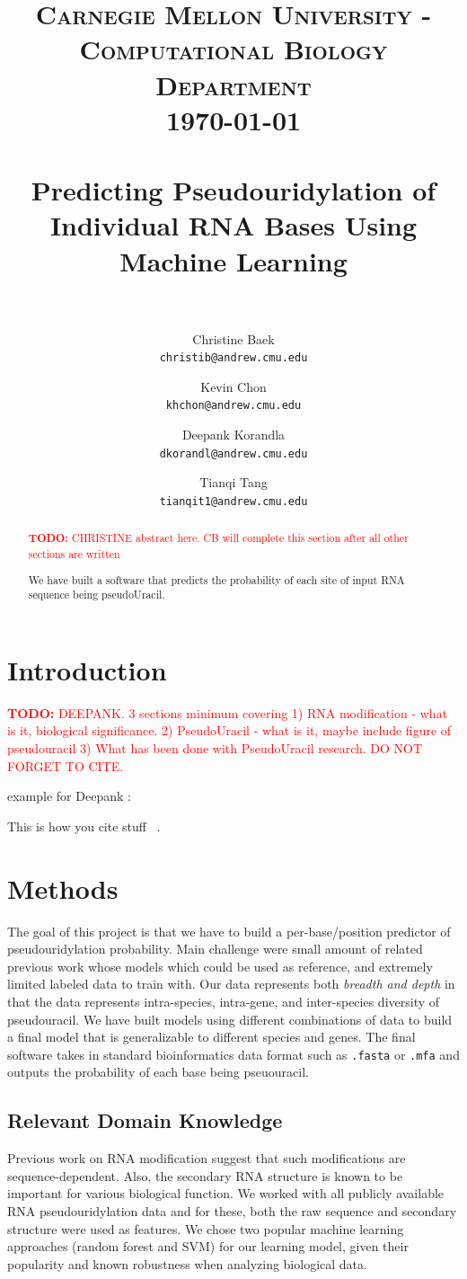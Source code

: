 \documentclass[paper=a4, fontsize=11pt]{scrartcl}
\title{
    \usefont{OT1}{bch}{b}{n}
    \normalfont \normalsize \textsc{Carnegie Mellon University - Computational Biology Department} \\ [25pt]
    \today \\
    \horrule{0.5pt} \\[0.4cm]
    \huge Predicting Pseudouridylation of Individual RNA Bases Using Machine Learning\\
    \horrule{2pt} \\[0.5cm]
}
\author{
  Christine Baek\\
  \normalsize\texttt{christib@andrew.cmu.edu}
  \and
  Kevin Chon\\
  \normalsize\texttt{khchon@andrew.cmu.edu}
  \and
  Deepank Korandla\\
  \normalsize\texttt{dkorandl@andrew.cmu.edu}
   \and
  Tianqi Tang\\
  \normalsize\texttt{tianqit1@andrew.cmu.edu}
  \date{}
}
\date{}
\numberwithin{equation}{section}    %
\numberwithin{figure}{section}      %
\numberwithin{table}{section}       %
\newcommand{\TODO}[1]{\textcolor{red}{\textbf{TODO: } #1}}
\numberwithin{equation}{section}    %
\numberwithin{figure}{section}      %
\numberwithin{table}{section}       %
\begin{document}
\maketitle

\begin{abstract}
\TODO{CHRISTINE abstract here. CB will complete this section after all other sections are written}

We have built a software that predicts the probability of each site of input RNA sequence being pseudoUracil. 
\end{abstract}


\section{Introduction}

\TODO{DEEPANK. 3 sections minimum covering 1) RNA modification - what is it, biological significance. 2) PseudoUracil - what is it, maybe include figure of pseudouracil 3) What has been done with PseudoUracil research. DO NOT FORGET TO CITE.}

example for Deepank : 

This is how you cite stuff ~\cite{schwartz}.




\section{Methods}


The goal of this project is that we have to build a per-base/position predictor of pseudouridylation probability. Main challenge were small amount of related previous work whose models which could be used as reference, and extremely limited labeled data to train with. Our data represents both \textit{breadth and depth} in that the data represents intra-species, intra-gene, and inter-species diversity of pseudouracil. We have built models using different combinations of data to build a final model that is generalizable to different species and genes. The final software takes in standard bioinformatics data format such as \texttt{.fasta} or \texttt{.mfa} and outputs the probability of each base being pseuouracil. 


\subsection{Relevant Domain Knowledge}

Previous work on RNA modification suggest that such modifications are sequence-dependent. Also, the secondary RNA structure is known to be important for various biological function. We worked with all publicly available RNA pseudouridylation data and for these, both the raw sequence and secondary structure were used as features. We chose two popular machine learning approaches (random forest and SVM) for our learning model, given their popularity and known robustness when analyzing biological data. 
\end{document}
